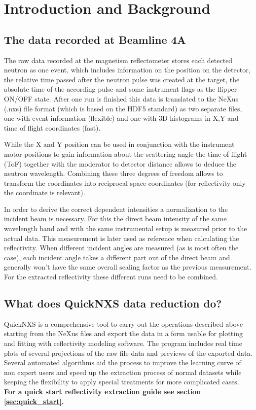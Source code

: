 \chapter{Introduction and Background}
\label{chap:introduction}

  \section{The data recorded at Beamline 4A}
      The raw data recorded at the magnetism reflectometer stores each detected neutron as one event, which includes information on
      the position on the detector, the relative time passed after the neutron pulse was created at the target, the absolute time of the
      according pulse and some instrument flags as the flipper ON/OFF state.
      After one run is finished this data is translated to the NeXus (.nxs) file format (which is based on the HDF5 standard) as two separate files,
      one with event information (flexible) and one with 3D histograms in X,Y and time of flight coordinates (fast).
      
      While the X and Y position can be used in conjunction with the instrument motor positions to gain information about the scattering
      angle the time of flight (ToF) together with the moderator to detector distance allows to deduce the neutron wavelength.
      Combining these three degrees of freedom allows to transform the coordinates into reciprocal space coordinates (for reflectivity
      only the \Qz coordinate is relevant).
      
      In order to derive the correct \Qz dependent intensities a normalization to the incident beam is necessary. 
      For this the direct beam intensity of the same wavelength band and with the same instrumental setup is measured
      prior to the actual data. This measurement is later used as reference when calculating the reflectivity.
      When different incident angles are measured (as is most often the case), each incident angle takes a different part out of
      the direct beam and generally won't have the same overall scaling factor as the previous measurement. For the extracted reflectivity
      these different runs need to be combined.
  
  \section{What does QuickNXS data reduction do?}
      QuickNXS is a comprehensive tool to carry out the operations described above starting from the NeXus files and export the
      data in a form usable for plotting and fitting with reflectivity modeling software.
      The program includes real time plots of several projections of the raw file data and previews of the exported data.
      Several automated algorithms aid the process to improve the learning curve of non expert users and speed up
      the extraction process of normal datasets while keeping the flexibility to apply special treatments for more
      complicated cases.
      \textbf{For a quick start reflectivity extraction guide see section \ref{sec:quick_start}.}
